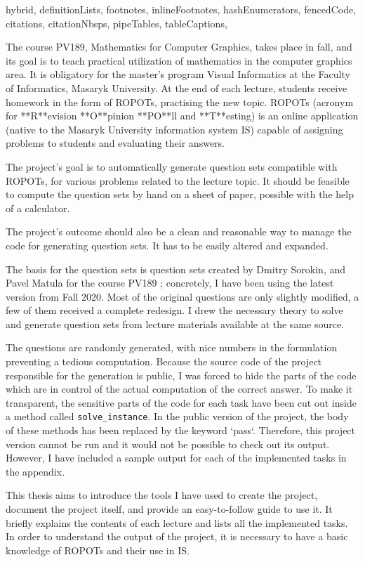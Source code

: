 \shorthandoff{-}
\begin{markdown*}{%
  hybrid,
  definitionLists,
  footnotes,
  inlineFootnotes,
  hashEnumerators,
  fencedCode,
  citations,
  citationNbsps,
  pipeTables,
  tableCaptions,
}

The course PV189, Mathematics for Computer Graphics, takes place in fall, and its goal is to teach practical utilization of mathematics in the computer graphics area. It is obligatory for the master's program Visual Informatics at the Faculty of Informatics, Masaryk University. At the end of each lecture, students receive homework in the form of ROPOTs, practising the new topic. ROPOTs (acronym for **R**evision **O**pinion **PO**ll and **T**esting) is an online application (native to the Masaryk University information system IS) capable of assigning problems to students and evaluating their answers.

The project's goal is to automatically generate question sets compatible with ROPOTs, for various problems related to the lecture topic. It should be feasible to compute the question sets by hand on a sheet of paper, possible with the help of a calculator.  

The project's outcome should also be a clean and reasonable way to manage the code for generating question sets. It has to be easily altered and expanded. 

The basis for the question sets is question sets created by Dmitry Sorokin, and Pavel Matula for the course PV189 \cite{ucebni_materialy}; concretely, I have been using the latest version from Fall 2020. Most of the original questions are only slightly modified, a few of them received a complete redesign. I drew the necessary theory to solve and generate question sets from lecture materials available at the same source. 

The questions are randomly generated, with nice numbers in the formulation preventing a tedious computation. Because the source code of the project responsible for the generation is public, I was forced to hide the parts of the code which are in control of the actual computation of the correct answer. To make it transparent, the sensitive parts of the code for each task have been cut out inside a method called \verb|solve_instance|. In the public version of the project, the body of these methods has been replaced by the keyword `pass`. Therefore, this project version cannot be run and it would not be possible to check out its output. However, I have included a sample output for each of the implemented tasks in the appendix.

This thesis aims to introduce the tools I have used to create the project, document the project itself, and provide an easy-to-follow guide to use it. It briefly explains the contents of each lecture and lists all the implemented tasks. In order to understand the output of the project, it is necessary to have a basic knowledge of ROPOTs and their use in IS.   

\end{markdown*}
\shorthandon{-}